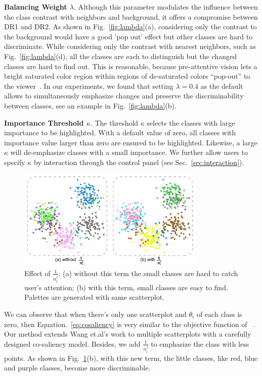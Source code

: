 \noindent\textbf{Balancing Weight $\lambda$}.
Although this parameter modulates the influence between the class contrast with neighbors and background, it offers a compromise between DR1 and DR2.
As shown in Fig.~\ref{fig:lambda}(a), considering only the contrast to the background would have a good 'pop out' effect but other classes are hard to discriminate. While considering only the contrast with nearest neighbors, such as Fig.~\ref{fig:lambda}(d), all the classes are each to distinguish but the changed classes are hard to find out.
This is reasonable, because pre-attentive vision
lets a bright saturated color region within  regions of de-saturated colors ``pop-out'' to the viewer~\cite{healey1995visualizing}.
In our experiments, we found that setting  $\lambda=0.4$ as the default allows to simultaneously emphasize changes and preserve the discriminability between classes, see an example in Fig.~\ref{fig:lambda}(b).


\vspace{1.5mm}
\noindent\textbf{Importance Threshold $\kappa$}.
The threshold $\kappa$ selects the classes with large importance to be highlighted.
With a default value of zero, all classes with importance value larger than zero are ensured to be highlighted. Likewise, a large $\kappa$ will de-emphasize classes with a small importance.
We further allow users to specify $\kappa$ by interaction through the control panel (see Sec.~\ref{sec:interaction}).

\begin{figure}[h]
\centering
\includegraphics[width=0.8\textwidth]{figures/nij.pdf}
\caption{Effect of $\frac{1}{n^j_i}$: (a) without this term the small classes are hard to catch user's attention; (b) with this term, small classes are easy to find. Palettes are generated with same scatterplot.}
\vspace*{-3mm}
\label{fig:nij}
\end{figure}

We can observe that when there's only one scatterplot and $\theta_i$ of each class is zero, then Equation.~\ref{eq:cosaliency} is very similar to the objective function of ~\cite{Wang2018}. Our method extends Wang et.al's work to multiple scatterplots with a carefully designed co-saliency model. Besides, we add $\frac{1}{n^j_i}$ to emphasize the class with less points. As shown in Fig.~\ref{fig:nij}(b), with this new term, the little classes, like red, blue and purple classes, become more discriminable.
